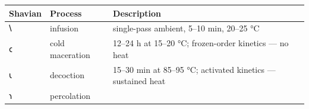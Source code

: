\begin{longtable}[]{@{}lll@{}}
\toprule
\begin{minipage}[b]{0.30\columnwidth}\raggedright
Shavian\strut
\end{minipage} & \begin{minipage}[b]{0.30\columnwidth}\raggedright
Process\strut
\end{minipage} & \begin{minipage}[b]{0.30\columnwidth}\raggedright
Description\strut
\end{minipage}\tabularnewline
\midrule
\endhead
\begin{minipage}[t]{0.30\columnwidth}\raggedright
𐑘\strut
\end{minipage} & \begin{minipage}[t]{0.30\columnwidth}\raggedright
infusion\strut
\end{minipage} & \begin{minipage}[t]{0.30\columnwidth}\raggedright
single-pass ambient, 5--10 min, 20--25 °C\strut
\end{minipage}\tabularnewline
\begin{minipage}[t]{0.30\columnwidth}\raggedright
𐑤\strut
\end{minipage} & \begin{minipage}[t]{0.30\columnwidth}\raggedright
cold maceration\strut
\end{minipage} & \begin{minipage}[t]{0.30\columnwidth}\raggedright
12--24 h at 15--20 °C; frozen-order kinetics --- no heat\strut
\end{minipage}\tabularnewline
\begin{minipage}[t]{0.30\columnwidth}\raggedright
𐑧\strut
\end{minipage} & \begin{minipage}[t]{0.30\columnwidth}\raggedright
decoction\strut
\end{minipage} & \begin{minipage}[t]{0.30\columnwidth}\raggedright
15--30 min at 85--95 °C; activated kinetics --- sustained heat\strut
\end{minipage}\tabularnewline
\begin{minipage}[t]{0.30\columnwidth}\raggedright
𐑪\strut
\end{minipage} & \begin{minipage}[t]{0.30\columnwidth}\raggedright
percolation\strut
\end{minipage} & \begin{minipage}[t]{0.30\columnwidth}\raggedright

\end{minipage}
\end{longtable}
